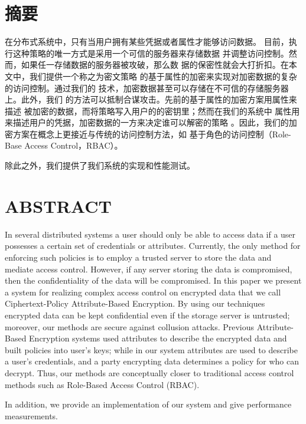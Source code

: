 \chapter*{摘\qquad 要}
在分布式系统中，只有当用户拥有某些凭据或者属性才能够访问数据。
目前，执行这种策略的唯一方式是采用一个可信的服务器来存储数据
并调整访问控制。然而，如果任一存储数据的服务器被攻破，那么数
据的保密性就会大打折扣。在本文中，我们提供一个称之为密文策略
的基于属性的加密来实现对加密数据的复杂的访问控制。通过我们的
技术，加密数据甚至可以存储在不可信的存储服务器上。此外，我们
的方法可以抵制合谋攻击。先前的基于属性的加密方案用属性来描述
被加密的数据，而将策略写入用户的的密钥里；然而在我们的系统中
属性用来描述用户的凭据，加密数据的一方来决定谁可以解密的策略
。因此，我们的加密方案在概念上更接近与传统的访问控制方法，如
基于角色的访问控制（Role-Base Access Control，RBAC）。\par
除此之外，我们提供了我们系统的实现和性能测试。
\chapter*{ABSTRACT}
In several distributed systems a user should only be %
able to access data if a user possesses a certain set of %
credentials or attributes. Currently, the only method %
for enforcing such policies is to employ a trusted server %
to store the data and mediate access control. However, %
if any server storing the data is compromised, then the %
confidentiality of the data will be compromised. In this %
paper we present a system for realizing complex access %
control on encrypted data that we call Ciphertext-Policy %
Attribute-Based Encryption. By using our techniques %
encrypted data can be kept confidential even if the %
storage server is untrusted; moreover, our methods are %
secure against collusion attacks. Previous Attribute-Based %
Encryption systems used attributes to describe %
the encrypted data and built policies into user’s keys;%
while in our system attributes are used to describe a %
user’s credentials, and a party encrypting data determines %
a policy for who can decrypt. Thus, our methods %
are conceptually closer to traditional access control %
methods such as Role-Based Access Control (RBAC).\par
In addition, we provide an implementation of our system %
and give performance measurements.

